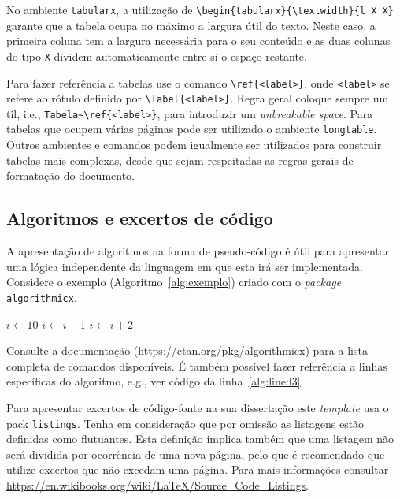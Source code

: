 No ambiente \verb|tabularx|, a utilização de \verb|\begin{tabularx}{\textwidth}{l X X}| garante que a tabela ocupa  no máximo a largura útil do texto. Neste caso, a primeira coluna tem a largura necessária para o seu conteúdo e as duas colunas do tipo \verb|X| dividem automaticamente entre si o espaço restante.

Para fazer referência a tabelas use o comando \verb|\ref{<label>}|, onde \verb|<label>| se refere ao rótulo definido por \verb|\label{<label>}|. Regra geral coloque sempre um til, i.e., \verb|Tabela~\ref{<label>}|, para introduzir um \textit{unbreakable space}. Para tabelas que ocupem várias páginas pode ser utilizado o ambiente \verb|longtable|. Outros ambientes e comandos podem igualmente ser utilizados para construir tabelas mais complexas, desde que sejam respeitadas as regras gerais de formatação do documento.


\subsection{Algoritmos e excertos de código}

A apresentação de algoritmos na forma de pseudo-código é útil para apresentar uma lógica independente da linguagem em que esta irá ser implementada. Considere o exemplo (Algoritmo~\ref{alg:exemplo}) criado com o \textit{package} \verb|algorithmicx|. 

\begin{algorithm}[hbt!]
\caption{Exemplo de um algoritmo}
\label{alg:exemplo}
\hrulefill
\begin{algorithmic}[1]
\State $i \gets 10$
    \State $i \gets i-1$ 	\label{alg:line:l3}
\Else
        \State $i \gets i+2$ 
    \EndIf
\EndIf 
\end{algorithmic}
\hrulefill
\end{algorithm}

Consulte a documentação (\url{https://ctan.org/pkg/algorithmicx}) para a lista completa de comandos disponíveis. É também possível fazer referência a linhas específicas do algoritmo, e.g., ver código da linha~\ref{alg:line:l3}.

Para apresentar excertos de código-fonte na sua dissertação este \textit{template} usa o \gls{pack} \verb|listings|. Tenha em consideração que por omissão as listagens estão definidas como flutuantes. Esta definição implica também que uma listagem não será dividida por ocorrência de uma nova página, pelo que é recomendado que utilize excertos que não excedam uma página. Para mais informações consultar \url{https://en.wikibooks.org/wiki/LaTeX/Source_Code_Listings}.

